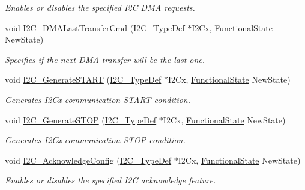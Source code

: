 \begin{DoxyCompactItemize}
\begin{DoxyCompactList}\small\item\em Enables or disables the specified I2C D\+MA requests. \end{DoxyCompactList}\item 
void \hyperlink{group___i2_c___private___functions_gab2e994c5681eb6ec7c26a03ffe1de060}{I2\+C\+\_\+\+D\+M\+A\+Last\+Transfer\+Cmd} (\hyperlink{struct_i2_c___type_def}{I2\+C\+\_\+\+Type\+Def} $\ast$I2\+Cx, \hyperlink{group___exported__types_gac9a7e9a35d2513ec15c3b537aaa4fba1}{Functional\+State} New\+State)
\begin{DoxyCompactList}\small\item\em Specifies if the next D\+MA transfer will be the last one. \end{DoxyCompactList}\item 
void \hyperlink{group___i2_c___private___functions_ga36c522b471588be9779c878222ccb20f}{I2\+C\+\_\+\+Generate\+S\+T\+A\+RT} (\hyperlink{struct_i2_c___type_def}{I2\+C\+\_\+\+Type\+Def} $\ast$I2\+Cx, \hyperlink{group___exported__types_gac9a7e9a35d2513ec15c3b537aaa4fba1}{Functional\+State} New\+State)
\begin{DoxyCompactList}\small\item\em Generates I2\+Cx communication S\+T\+A\+RT condition. \end{DoxyCompactList}\item 
void \hyperlink{group___i2_c___private___functions_ga5c92cb573ca0ae58cc465e5400246561}{I2\+C\+\_\+\+Generate\+S\+T\+OP} (\hyperlink{struct_i2_c___type_def}{I2\+C\+\_\+\+Type\+Def} $\ast$I2\+Cx, \hyperlink{group___exported__types_gac9a7e9a35d2513ec15c3b537aaa4fba1}{Functional\+State} New\+State)
\begin{DoxyCompactList}\small\item\em Generates I2\+Cx communication S\+T\+OP condition. \end{DoxyCompactList}\item 
void \hyperlink{group___i2_c___private___functions_ga7bb44e894d68a7991f564c43fb187486}{I2\+C\+\_\+\+Acknowledge\+Config} (\hyperlink{struct_i2_c___type_def}{I2\+C\+\_\+\+Type\+Def} $\ast$I2\+Cx, \hyperlink{group___exported__types_gac9a7e9a35d2513ec15c3b537aaa4fba1}{Functional\+State} New\+State)
\begin{DoxyCompactList}\small\item\em Enables or disables the specified I2C acknowledge feature. \end{DoxyCompactList}\item 

\end{DoxyCompactItemize}

